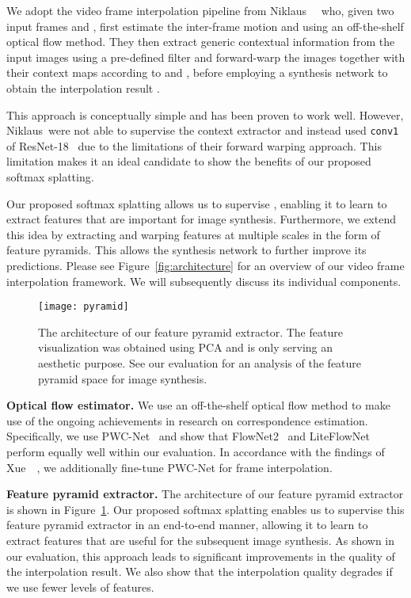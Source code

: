 \documentclass[10pt,twocolumn,letterpaper]{article}
\begin{document}
We adopt the video frame interpolation pipeline from Niklaus~\etal~\cite{Niklaus_CVPR_2018} who, given two input frames  and , first estimate the inter-frame motion  and  using an off-the-shelf optical flow method. They then extract generic contextual information from the input images using a pre-defined filter  and forward-warp  the images together with their context maps according to  and , before employing a synthesis network  to obtain the interpolation result .

This approach is conceptually simple and has been proven to work well. However, Niklaus~\etal were not able to supervise the context extractor  and instead used \texttt{conv1} of ResNet-18~\cite{He_CVPR_2016} due to the limitations of their forward warping  approach. This limitation makes it an ideal candidate to show the benefits of our proposed softmax splatting.

Our proposed softmax splatting allows us to supervise , enabling it to learn to extract features that are important for image synthesis. Furthermore, we extend this idea by extracting and warping features at multiple scales in the form of feature pyramids. This allows the synthesis network  to further improve its predictions. Please see Figure~\ref{fig:architecture} for an overview of our video frame interpolation framework. We will subsequently discuss its individual components.

\begin{figure}\centering
    \texttt{[image: pyramid]}\vspace{-0.1cm}
	\caption{The architecture of our feature pyramid extractor. The feature visualization was obtained using PCA and is only serving an aesthetic purpose. See our evaluation for an analysis of the feature pyramid space for image synthesis.}\vspace{-0.3cm}
	\label{fig:pyramid}
\end{figure}

\vspace{0.05in}
\noindent\textbf{Optical flow estimator.} We use an off-the-shelf optical flow method to make use of the ongoing achievements in research on correspondence estimation. Specifically, we use PWC-Net~\cite{Sun_CVPR_2018} and show that FlowNet2~\cite{Ilg_CVPR_2017} and LiteFlowNet~\cite{Hui_CVPR_2018} perform equally well within our evaluation. In accordance with the findings of Xue~\etal~\cite{Xue_IJCV_2019}, we additionally fine-tune PWC-Net for frame interpolation.

\vspace{0.05in}
\noindent\textbf{Feature pyramid extractor.} The architecture of our feature pyramid extractor is shown in Figure~\ref{fig:pyramid}. Our proposed softmax splatting enables us to supervise this feature pyramid extractor in an end-to-end manner, allowing it to learn to extract features that are useful for the subsequent image synthesis. As shown in our evaluation, this approach leads to significant improvements in the quality of the interpolation result. We also show that the interpolation quality degrades if we use fewer levels of features.
\end{document}
